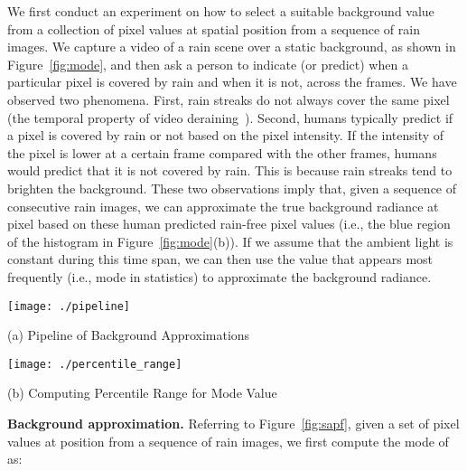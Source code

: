 \documentclass[10pt,twocolumn,letterpaper]{article}
\begin{document}
We first conduct an experiment on how to select a suitable background value  from a collection of pixel values  at spatial position  from a sequence of  rain images. We capture a video of a rain scene over a static background, as shown in Figure~\ref{fig:mode}, and then ask a person to indicate (or predict) when a particular pixel is covered by rain and when it is not, across the  frames. We have observed two phenomena.
First, rain streaks do not always cover the same pixel (the temporal property of video deraining~\cite{zhang:icme:2006:temporal}).
Second, humans typically predict if a pixel is covered by rain or not based on the pixel intensity. If the intensity of the pixel is lower at a certain frame compared with the other frames, humans would predict that it is not covered by rain. This is because rain streaks tend to brighten the background. These two observations imply that, given a sequence of  consecutive rain images, we can approximate the true background radiance  at pixel  based on these human predicted rain-free pixel values (i.e., the blue region of the histogram in Figure~\ref{fig:mode}(b)). If we assume that the ambient light is constant during this time span, we can then use the value that appears most frequently (i.e., mode in statistics) to approximate the background radiance.



\begin{figure*}[ht]
\begin{minipage}[t]{0.67\textwidth}
\centering
\texttt{[image: ./pipeline]}
\centerline{\footnotesize (a) Pipeline of Background Approximations}
\end{minipage}
\begin{minipage}[t]{0.32\textwidth}
\centering
\texttt{[image: ./percentile\_range]}
\centerline{\footnotesize (b) Computing Percentile Range for Mode Value}
\end{minipage}
\vspace{0.05in}
\caption{Overview of our clean image generation pipeline (a). Given a sequence of rain images, we compute the mode for each pixel based on its intensity changes over time, and the percentile range of its mode. We then consider the global spatial smoothness by finding a percentile rank that can cross most of the percentile ranges (b).}
	\label{fig:sapf}
	\vspace{-3mm}
\end{figure*}

{\bf Background approximation.} Referring to Figure~\ref{fig:sapf}, given a set of pixel values  at position  from a sequence of  rain images, we first compute the mode of  as:
\end{document}
